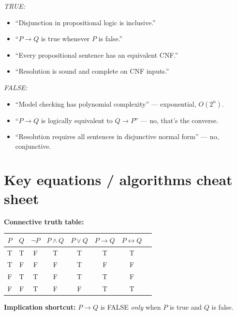 \documentclass[11pt, a4paper]{article}
\begin{document}
\begin{exambox}
\textit{TRUE:}
\begin{itemize}[leftmargin=*, itemsep=0pt, topsep=0pt]
  \item ``Disjunction in propositional logic is inclusive.''
  \item ``$P \rightarrow Q$ is true whenever $P$ is false.''
  \item ``Every propositional sentence has an equivalent CNF.''
  \item ``Resolution is sound and complete on CNF inputs.''
\end{itemize}
\textit{FALSE:}
\begin{itemize}[leftmargin=*, itemsep=0pt, topsep=0pt]
  \item ``Model checking has polynomial complexity'' — exponential, $O(2^n)$.
  \item ``$P \rightarrow Q$ is logically equivalent to $Q \rightarrow P$'' — no, that's the converse.
  \item ``Resolution requires all sentences in disjunctive normal form'' — no, conjunctive.
\end{itemize}
\end{exambox}

\section*{Key equations / algorithms cheat sheet}

\textbf{Connective truth table:}
\begin{center}
\renewcommand{\arraystretch}{1.2}
\begin{tabular}{@{}cccccccc@{}}
\toprule
$P$ & $Q$ & $\neg P$ & $P \land Q$ & $P \lor Q$ & $P \rightarrow Q$ & $P \leftrightarrow Q$ \\
\midrule
T & T & F & T & T & T & T \\
T & F & F & F & T & F & F \\
F & T & T & F & T & T & F \\
F & F & T & F & F & T & T \\
\bottomrule
\end{tabular}
\end{center}

\textbf{Implication shortcut:} $P \rightarrow Q$ is FALSE \emph{only} when $P$ is true and $Q$ is false.
\end{document}
